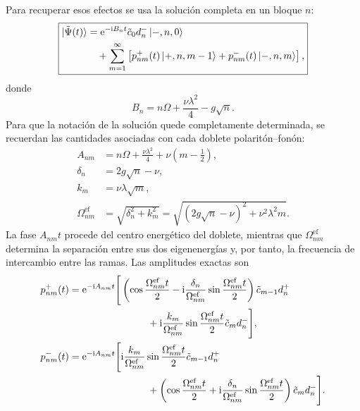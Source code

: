 \documentclass[11pt]{article}
\newcommand{\ii}{\mathrm{i}}
\newcommand{\ee}{\mathrm{e}}
\begin{document}
Para recuperar esos efectos se usa la soluci\'on completa en un bloque $n$:
\begin{equation}
  \boxed{
  \begin{aligned}
  \ket{\tilde\Psi(t)}
  &=
  \ee^{-\ii B_nt}\tilde c_0d_n^-\ket{-,n,0}
  \\
  &\quad+
  \sum_{m=1}^{\infty}
  \left[
  p_{nm}^+(t)\ket{+,n,m-1}
  +
  p_{nm}^-(t)\ket{-,n,m}
  \right],
  \end{aligned}
  }
\end{equation}
donde
\begin{equation}
  \boxed{
  B_n=n\Omega+\frac{\nu\lambda^2}{4}-g\sqrt n.
  }
\end{equation}
Para que la notaci\'on de la soluci\'on quede completamente determinada, se
recuerdan las cantidades asociadas con cada doblete polarit\'on--fon\'on:
\begin{equation}
  \boxed{
  \begin{aligned}
  A_{nm}
  &=
  n\Omega+\frac{\nu\lambda^2}{4}
  +\nu\left(m-\frac12\right),
  \\
  \delta_n
  &=2g\sqrt n-\nu,
  \\
  k_m
  &=\nu\lambda\sqrt m,
  \\
  \Omega_{nm}^{\mathrm{ef}}
  &=\sqrt{\delta_n^2+k_m^2}
  =\sqrt{(2g\sqrt n-\nu)^2+\nu^2\lambda^2m}.
  \end{aligned}
  }
\end{equation}
La fase $A_{nm}t$ procede del centro energ\'etico del doblete, mientras que
$\Omega_{nm}^{\mathrm{ef}}$ determina la separaci\'on entre sus dos
eigenenerg\'ias y, por tanto, la frecuencia de intercambio entre las ramas.
Las amplitudes exactas son
\begin{align}
  p_{nm}^+(t)
  &=
  \ee^{-\ii A_{nm}t}
  \Bigg[
  \left(
  \cos\frac{\Omega_{nm}^{\mathrm{ef}}t}{2}
  -
  \ii\frac{\delta_n}{\Omega_{nm}^{\mathrm{ef}}}
  \sin\frac{\Omega_{nm}^{\mathrm{ef}}t}{2}
  \right)\tilde c_{m-1}d_n^+
  \notag\\
  &\hspace{2.8cm}
  +
  \ii\frac{k_m}{\Omega_{nm}^{\mathrm{ef}}}
  \sin\frac{\Omega_{nm}^{\mathrm{ef}}t}{2}
  \tilde c_md_n^-
  \Bigg],
  \\
  p_{nm}^-(t)
  &=
  \ee^{-\ii A_{nm}t}
  \Bigg[
  \ii\frac{k_m}{\Omega_{nm}^{\mathrm{ef}}}
  \sin\frac{\Omega_{nm}^{\mathrm{ef}}t}{2}
  \tilde c_{m-1}d_n^+
  \notag\\
  &\hspace{2.8cm}
  +
  \left(
  \cos\frac{\Omega_{nm}^{\mathrm{ef}}t}{2}
  +
  \ii\frac{\delta_n}{\Omega_{nm}^{\mathrm{ef}}}
  \sin\frac{\Omega_{nm}^{\mathrm{ef}}t}{2}
  \right)\tilde c_md_n^-
  \Bigg].
\end{align}
\end{document}

